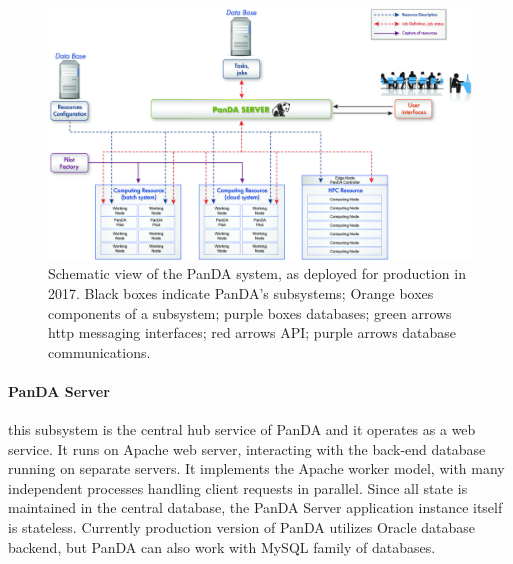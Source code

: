 \begin{figure}
  \begin{center}
    \includegraphics[width=\columnwidth]{figures/PandaArch.jpg}
  \end{center}
\caption{Schematic view of
the PanDA system, as deployed for production in 2017. Black boxes indicate
PanDA's subsystems; Orange boxes components of a subsystem; purple boxes
databases; green arrows http messaging interfaces; red arrows API; purple arrows
database communications.}
\label{fig:architecture}
\end{figure}

\paragraph{\textbf{PanDA Server}} this subsystem is the central hub service of
PanDA and it operates as a web service. It runs on Apache web server,
interacting with the back-end database running on separate servers. It
implements the Apache worker model, with many independent processes handling
client requests in parallel. Since all state is maintained in the central
database, the PanDA Server application instance itself is stateless. Currently
production version of PanDA utilizes Oracle database backend, but PanDA can also
work with MySQL family of databases.

